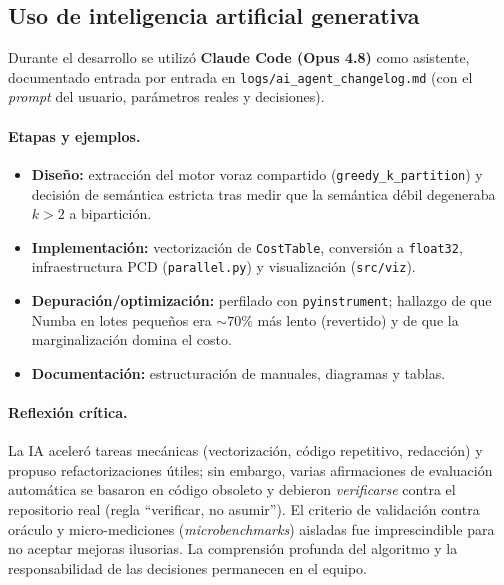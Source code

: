 \documentclass[11pt,letterpaper]{article}
\begin{document}
\subsection{Uso de inteligencia artificial generativa}
Durante el desarrollo se utilizó \textbf{Claude Code (Opus 4.8)} como asistente,
documentado entrada por entrada en \texttt{logs/ai\_agent\_changelog.md} (con el
\emph{prompt} del usuario, parámetros reales y decisiones).

\paragraph{Etapas y ejemplos.}
\begin{itemize}
	\item \textbf{Diseño:} extracción del motor voraz compartido
	      (\texttt{greedy\_k\_partition}) y decisión de semántica estricta tras medir que
	      la semántica débil degeneraba $k>2$ a bipartición.
	\item \textbf{Implementación:} vectorización de \texttt{CostTable}, conversión a
	      \texttt{float32}, infraestructura PCD (\texttt{parallel.py}) y visualización
	      (\texttt{src/viz}).
	\item \textbf{Depuración/optimización:} perfilado con \texttt{pyinstrument};
	      hallazgo de que Numba en lotes pequeños era $\sim\!70\%$ más lento (revertido) y
	      de que la marginalización domina el costo.
	\item \textbf{Documentación:} estructuración de manuales, diagramas y tablas.
\end{itemize}

\paragraph{Reflexión crítica.} La IA aceleró tareas mecánicas (vectorización, código
repetitivo, redacción) y propuso refactorizaciones útiles; sin embargo, varias
afirmaciones de evaluación automática se basaron en código obsoleto y debieron
\emph{verificarse} contra el repositorio real (regla ``verificar, no asumir''). El
criterio de validación contra oráculo y micro-mediciones (\emph{microbenchmarks})
aisladas fue imprescindible para no aceptar mejoras ilusorias. La comprensión profunda
del algoritmo y la responsabilidad de las decisiones permanecen en el equipo.
\end{document}
